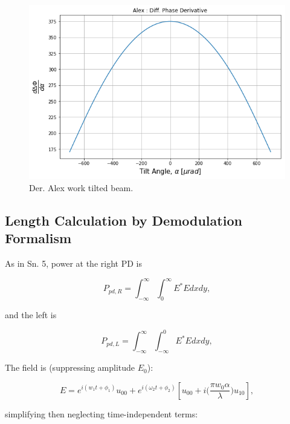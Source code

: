 \documentclass[aps,twoside,secnumarabic,balancelastpage,amsmath,amssymb,nofootinbib,hyperref=pdftex]{revtex4}
\newcommand{\bigfrac}[2]{\Big( \frac{#1}{#2}\Big)}
\begin{document}
\begin{figure}
	\centering
		\includegraphics[scale=.65]{tilt-al-der}
		\caption{Der. Alex work tilted beam.}
		\label{fig:8}
\end{figure}

\clearpage

\subsection{Length Calculation by Demodulation Formalism}

As in Sn. 5, power at the right PD is

\begin{equation*}
P_{pd,R} = \int_{-\infty}^{\infty}\int_{0}^{\infty} E^* E dx dy,
\end{equation*}

and the left is

 \begin{equation*}
P_{pd,L} = \int_{-\infty}^{\infty}\int_{-\infty}^{0} E^* E dx dy,
\end{equation*}

The field is (suppressing amplitude $E_0$):

\begin{equation}
E = e^{i(w_{1}t + \phi_1)} u_{00} 
+ 
e^{i(\omega_{2}t + \phi_2)}
\left[
 u_{00}
 +
 i\bigfrac{\pi w_0 \alpha}{\lambda} u_{10}
 \right],
\end{equation}

simplifying then neglecting time-independent terms:
\end{document}
